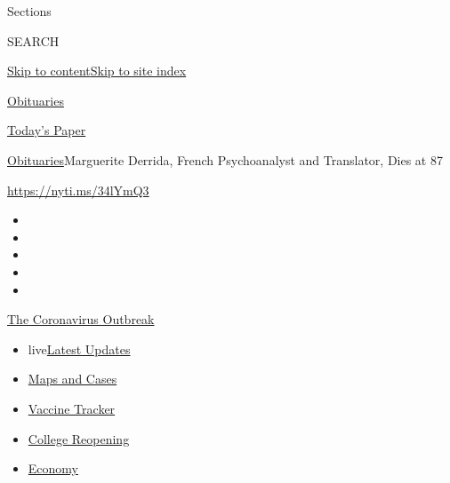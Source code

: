 Sections

SEARCH

\protect\hyperlink{site-content}{Skip to
content}\protect\hyperlink{site-index}{Skip to site index}

\href{https://www.nytimes.com/section/obituaries}{Obituaries}

\href{https://myaccount.nytimes.com/auth/login?response_type=cookie\&client_id=vi}{}

\href{https://www.nytimes.com/section/todayspaper}{Today's Paper}

\href{/section/obituaries}{Obituaries}\textbar{}Marguerite Derrida,
French Psychoanalyst and Translator, Dies at 87

\url{https://nyti.ms/34lYmQ3}

\begin{itemize}
\item
\item
\item
\item
\item
\end{itemize}

\href{https://www.nytimes.com/news-event/coronavirus?action=click\&pgtype=Article\&state=default\&region=TOP_BANNER\&context=storylines_menu}{The
Coronavirus Outbreak}

\begin{itemize}
\tightlist
\item
  live\href{https://www.nytimes.com/2020/08/03/world/coronavirus-covid-19.html?action=click\&pgtype=Article\&state=default\&region=TOP_BANNER\&context=storylines_menu}{Latest
  Updates}
\item
  \href{https://www.nytimes.com/interactive/2020/us/coronavirus-us-cases.html?action=click\&pgtype=Article\&state=default\&region=TOP_BANNER\&context=storylines_menu}{Maps
  and Cases}
\item
  \href{https://www.nytimes.com/interactive/2020/science/coronavirus-vaccine-tracker.html?action=click\&pgtype=Article\&state=default\&region=TOP_BANNER\&context=storylines_menu}{Vaccine
  Tracker}
\item
  \href{https://www.nytimes.com/2020/08/02/us/covid-college-reopening.html?action=click\&pgtype=Article\&state=default\&region=TOP_BANNER\&context=storylines_menu}{College
  Reopening}
\item
  \href{https://www.nytimes.com/live/2020/08/03/business/stock-market-today-coronavirus?action=click\&pgtype=Article\&state=default\&region=TOP_BANNER\&context=storylines_menu}{Economy}
\end{itemize}

